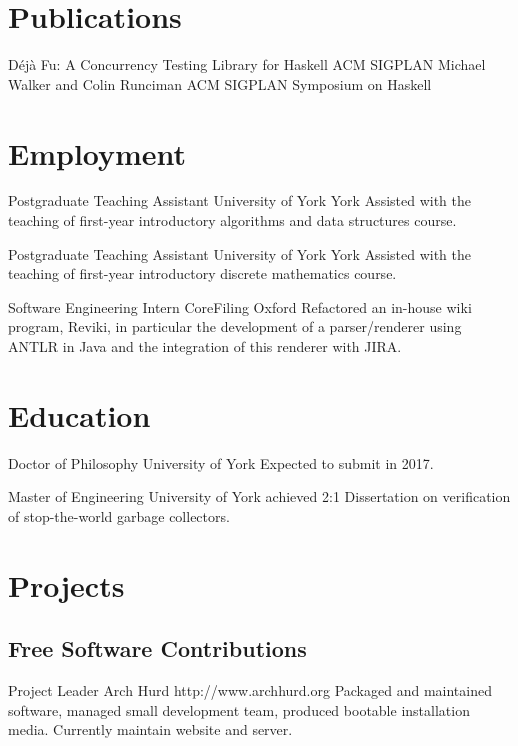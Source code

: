 \documentclass[a4paper,11pt,long]{cv}
\begin{document}
\section{Publications}

  {Déjà Fu: A Concurrency Testing Library for Haskell}
  {ACM SIGPLAN}
  {Michael Walker and Colin Runciman}
  {ACM SIGPLAN Symposium on Haskell}

\section{Employment}

  {Postgraduate Teaching Assistant}
  {University of York}
  {York}
  {Assisted with the teaching of first-year introductory algorithms and
    data structures course.}

  {Postgraduate Teaching Assistant}
  {University of York}
  {York}
  {Assisted with the teaching of first-year introductory discrete mathematics course.}

  {Software Engineering Intern}
  {CoreFiling}
  {Oxford}
  {Refactored an in-house wiki program, Reviki, in particular the
    development of a parser/renderer using ANTLR in Java and the
    integration of this renderer with JIRA.}

\section{Education}

  {Doctor of Philosophy}
  {University of York}
  {}
  {Expected to submit in 2017.}

  {Master of Engineering}
  {University of York}
  {achieved 2:1}
  {Dissertation on verification of stop-the-world garbage collectors.}

\section{Projects}

\subsection{Free Software Contributions}

  {Project Leader}
  {Arch Hurd}
  {http://www.archhurd.org}
  {Packaged and maintained software, managed small development team,
    produced bootable installation media. Currently maintain website
    and server.}
\end{document}
